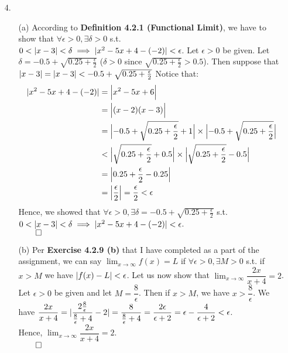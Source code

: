 \documentclass[11pt]{article}
\DeclarePairedDelimiter\abs{\lvert}{\rvert}%
\DeclarePairedDelimiter\absb{\Big\lvert}{\Big\rvert}%
\begin{document}
\begin{itemize}
    \item[4.]
        \begin{itemize}
            \item[(a)]
                According to \textbf{Definition 4.2.1 (Functional Limit)},
                we have to show that $\forall \epsilon > 0, \exists \delta > 0$
                s.t. $0 < \abs{x - 3} < \delta \implies \abs{x^2 - 5x + 4 -
                (-2)} < \epsilon$. Let $\epsilon > 0$ be given. Let
                $\delta = -0.5 + \sqrt{0.25 + \frac{\epsilon}{2}}$
                ($\delta > 0$ since $\sqrt{0.25 + \frac{\epsilon}{2}} > 0.5$).
                Then suppose that $\abs{x - 3} = \abs{x - 3} < -0.5 +
                \sqrt{0.25 + \frac{\epsilon}{2}}$
                Notice that:
                \begin{align*}
                    \abs{x^2 - 5x + 4 - (-2)} &= \absb{x^2 - 5x + 6}\\
                                              &= \absb{(x - 2)(x - 3)}\\
                                              &= \absb{-0.5 + \sqrt{0.25 + \frac{\epsilon}{2}} + 1} \times \absb{-0.5 + \sqrt{0.25 + \frac{\epsilon}{2}}}\\
                                              &< \absb{\sqrt{0.25 + \frac{\epsilon}{2}} + 0.5} \times \absb{\sqrt{0.25 + \frac{\epsilon}{2}} - 0.5}\\
                                              &= \absb{0.25 + \frac{\epsilon}{2} - 0.25}\\
                                              &= \absb{\frac{\epsilon}{2}} = \frac{\epsilon}{2} < \epsilon
                \end{align*}
                Hence, we showed that $\forall \epsilon > 0, \exists \delta =
                -0.5 + \sqrt{0.25 + \frac{\epsilon}{2}}$ s.t.
                $0 < \abs{x - 3} < \delta \implies \abs{x^2 - 5x + 4 - (-2)} <
                \epsilon$.\\
                $\qed$

            \item[(b)]
                Per \textbf{Exercise 4.2.9 (b)} that I have completed as a part
                of the assignment, we can say $\lim_{x \to \infty} f(x) = L$ if
                $\forall \epsilon > 0, \exists M > 0$ s.t. if $x > M$ we have
                $\abs{f(x) - L} < \epsilon$. Let us now show that $\lim_{x \to
                \infty} \dfrac{2x}{x + 4} = 2$. Let $\epsilon > 0$ be given and
                let $M = \dfrac{8}{\epsilon}$. Then if $x > M$, we have
                $x > \dfrac{8}{\epsilon}$. We have
                $\dfrac{2x}{x + 4} =
                \abs{\dfrac{2 \frac{8}{\epsilon}}{\frac{8}{\epsilon} + 4}  - 2}
                = \dfrac{8}{\frac{8}{\epsilon} + 4} =
                \dfrac{2\epsilon}{\epsilon + 2} =
                \epsilon - \dfrac{4}{\epsilon + 2} < \epsilon$.\\
                Hence, $\lim_{x \to \infty} \dfrac{2x}{x + 4} = 2$.\\
                $\qed$
        \end{itemize}
    

\end{itemize}
\end{document}
